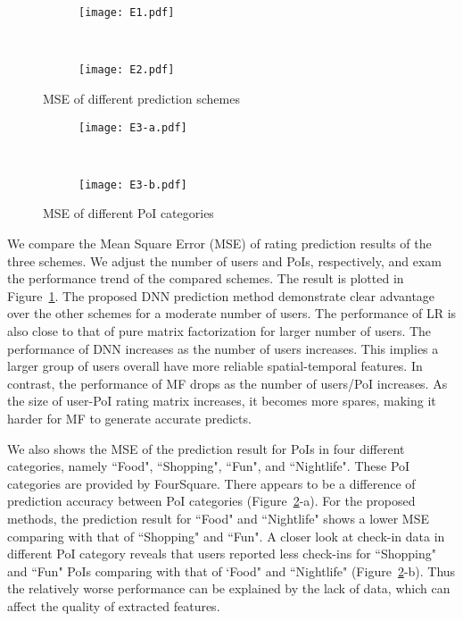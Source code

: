 \begin{figure}[ht]%
        \centering
        \begin{subfigure}{0.25\textwidth}
               \texttt{[image: E1.pdf]}
        \end{subfigure}%
        ~ %
        \begin{subfigure}{0.25\textwidth}
                \texttt{[image: E2.pdf]}
        \end{subfigure}
         \caption{MSE of different prediction schemes}\label{E12}
         \vspace{-2mm}
\end{figure}

\begin{figure}[htb]%
        \centering
        \begin{subfigure}{0.25\textwidth}
               \texttt{[image: E3-a.pdf]}
        \end{subfigure}%
        ~ %
        \begin{subfigure}{0.25\textwidth}
                \texttt{[image: E3-b.pdf]}
        \end{subfigure}
         \caption{MSE of different PoI categories}\label{E3}
         \vspace{-2mm}
\end{figure}

We compare the Mean Square Error (MSE) of rating prediction results of the three schemes. We adjust the number of users and PoIs, respectively, and exam the performance trend of the compared schemes. The result is plotted in Figure~\ref{E12}. The proposed DNN prediction method demonstrate clear advantage over the other schemes for a moderate number of users. The performance of LR is also close to that of pure matrix factorization for larger number of users. The performance of DNN increases as the number of users increases. This implies a larger group of users overall have more reliable spatial-temporal features. In contrast, the performance of MF drops as the number of users/PoI increases. As the size of user-PoI rating matrix increases, it becomes more spares, making it harder for MF to generate accurate predicts. 

We also shows the MSE of the prediction result for PoIs in four different categories, namely ``Food", ``Shopping", ``Fun", and ``Nightlife". These PoI categories are provided by FourSquare. There appears to be a difference of prediction accuracy between PoI categories (Figure~\ref{E3}-a). For the proposed methods, the prediction result for ``Food" and ``Nightlife" shows a lower MSE comparing with that of ``Shopping" and ``Fun". A closer look at check-in data in different PoI category reveals that users reported less check-ins for ``Shopping" and ``Fun" PoIs comparing with that of `Food" and ``Nightlife" (Figure~\ref{E3}-b). Thus the relatively worse performance can be explained by the lack of data, which can affect the quality of extracted features.


